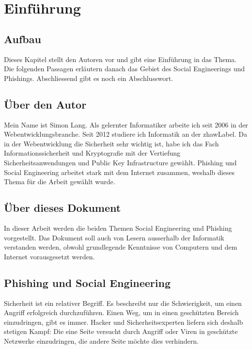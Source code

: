 \chapter{Einführung}
\label{sec:einfuehrung}

\section{Aufbau}
Dieses Kapitel stellt den Autoren vor und gibt eine Einführung in das Thema.
Die folgenden Passagen erläutern danach das Gebiet des Social Engineerings und Phishings.
Abschliessend gibt es noch ein Abschlusswort.

\section{Über den Autor}
\label{sec:einfuehrung:autor}
Mein Name ist Simon Lang. Als gelernter Informatiker arbeite ich seit 2006 in der Webentwicklungsbranche.
Seit 2012 studiere ich Informatik an der \Gls{zhawLabel}.
Da in der Webentwicklung die Sicherheit sehr wichtig ist, habe ich das Fach Informationssicherheit und Kryptografie mit der Vertiefung Sicherheitsanwendungen und Public Key Infrastructure gewählt. 
Phishing und Social Engineering arbeitet stark mit dem Internet zusammen, weshalb dieses Thema für die Arbeit gewählt wurde.

\section{Über dieses Dokument}
In dieser Arbeit werden die beiden Themen Social Engineering und Phishing vorgestellt. 
Das Dokument soll auch von Lesern ausserhalb der Informatik verstanden werden, obwohl grundlegende Kenntnisse von Computern und dem Internet vorausgesetzt werden.

\section{Phishing und Social Engineering}
Sicherheit ist ein relativer Begriff. Es beschreibt nur die Schwierigkeit, um einen Angriff erfolgreich durchzuführen. 
Einen Weg, um in einen geschützten Bereich einzudringen, gibt es immer. 
Hacker und Sicherheitsexperten liefern sich deshalb stetigen Kampf: Die eine Seite versucht durch Angriff oder Viren in geschützte Netzwerke einzudringen, die andere Seite möchte dies verhindern.


